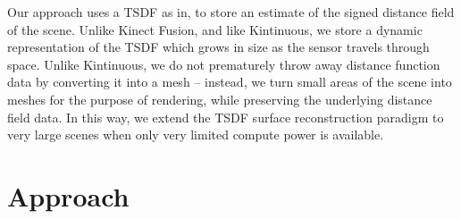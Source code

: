 \documentclass[10pt,twocolumn,letterpaper]{article}
\begin{document}
Our approach uses a TSDF as in\cite{Curless1996,Newcombe,Whelan2013,Bylow2013},
to store an estimate of the signed distance field of the scene. Unlike Kinect
Fusion, and like Kintinuous, we store a dynamic representation of the TSDF
which grows in size as the sensor travels through space. Unlike Kintinuous, we
do not prematurely throw away distance function data by converting it into a
mesh -- instead, we turn small areas of the scene into meshes for the purpose
of rendering, while preserving the underlying distance field data. In this way,
we extend the TSDF surface reconstruction paradigm to very large scenes when only
very limited compute power is available.

\section{Approach} 
\end{document}
